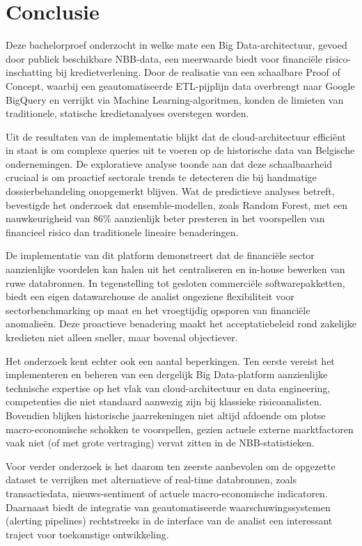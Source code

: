 
\chapter{Conclusie}%
\label{ch:conclusie}

Deze bachelorproef onderzocht in welke mate een Big Data-architectuur, gevoed door publiek beschikbare NBB-data, een meerwaarde biedt voor financiële risico-inschatting bij kredietverlening. Door de realisatie van een schaalbare Proof of Concept, waarbij een geautomatiseerde ETL-pijplijn data overbrengt naar Google BigQuery en verrijkt via Machine Learning-algoritmen, konden de limieten van traditionele, statische kredietanalyses overstegen worden.

Uit de resultaten van de implementatie blijkt dat de cloud-architectuur efficiënt in staat is om complexe queries uit te voeren op de historische data van Belgische ondernemingen. De exploratieve analyse toonde aan dat deze schaalbaarheid cruciaal is om proactief sectorale trends te detecteren die bij handmatige dossierbehandeling onopgemerkt blijven. Wat de predictieve analyses betreft, bevestigde het onderzoek dat ensemble-modellen, zoals Random Forest, met een nauwkeurigheid van 86\% aanzienlijk beter presteren in het voorspellen van financieel risico dan traditionele lineaire benaderingen.

De implementatie van dit platform demonstreert dat de financiële sector aanzienlijke voordelen kan halen uit het centraliseren en in-house bewerken van ruwe databronnen. In tegenstelling tot gesloten commerciële softwarepakketten, biedt een eigen datawarehouse de analist ongeziene flexibiliteit voor sectorbenchmarking op maat en het vroegtijdig opsporen van financiële anomalieën. Deze proactieve benadering maakt het acceptatiebeleid rond zakelijke kredieten niet alleen sneller, maar bovenal objectiever.

Het onderzoek kent echter ook een aantal beperkingen. Ten eerste vereist het implementeren en beheren van een dergelijk Big Data-platform aanzienlijke technische expertise op het vlak van cloud-architectuur en data engineering, competenties die niet standaard aanwezig zijn bij klassieke risicoanalisten. Bovendien blijken historische jaarrekeningen niet altijd afdoende om plotse macro-economische schokken te voorspellen, gezien actuele externe marktfactoren vaak niet (of met grote vertraging) vervat zitten in de NBB-statistieken.

Voor verder onderzoek is het daarom ten zeerste aanbevolen om de opgezette dataset te verrijken met alternatieve of real-time databronnen, zoals transactiedata, nieuws-sentiment of actuele macro-economische indicatoren. Daarnaast biedt de integratie van geautomatiseerde waarschuwingssystemen (alerting pipelines) rechtstreeks in de interface van de analist een interessant traject voor toekomstige ontwikkeling.